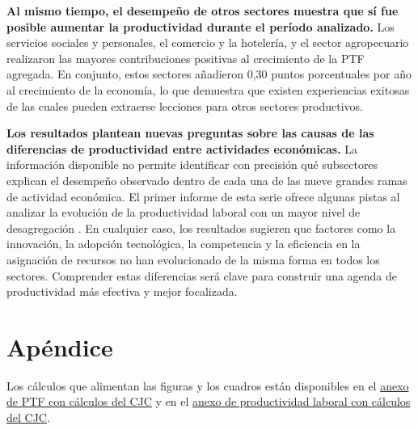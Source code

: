 \textbf{Al mismo tiempo, el desempeño de otros sectores muestra que sí fue posible aumentar la productividad durante el período analizado.} Los servicios sociales y personales, el comercio y la hotelería, y el sector agropecuario realizaron las mayores contribuciones positivas al crecimiento de la PTF agregada. En conjunto, estos sectores añadieron 0,30 puntos porcentuales por año al crecimiento de la economía, lo que demuestra que existen experiencias exitosas de las cuales pueden extraerse lecciones para otros sectores productivos.

\textbf{Los resultados plantean nuevas preguntas sobre las causas de las diferencias de productividad entre actividades económicas.} La información disponible no permite identificar con precisión qué subsectores explican el desempeño observado dentro de cada una de las nueve grandes ramas de actividad económica. El primer informe de esta serie ofrece algunas pistas al analizar la evolución de la productividad laboral con un mayor nivel de desagregación \citep{PardoOrozco2026ProductividadLaboral}. En cualquier caso, los resultados sugieren que factores como la innovación, la adopción tecnológica, la competencia y la eficiencia en la asignación de recursos no han evolucionado de la misma forma en todos los sectores. Comprender estas diferencias será clave para construir una agenda de productividad más efectiva y mejor focalizada.

{}

\small

\normalsize

\clearpage
\appendix
\renewcommand{\thetable}{A\arabic{table}}
\renewcommand{\thefigure}{A\arabic{figure}}
\renewcommand{\theHtable}{appendix.table.\arabic{table}}
\renewcommand{\theHfigure}{appendix.figure.\arabic{figure}}
\renewcommand{\theequation}{A\arabic{equation}}
\renewcommand{\theHequation}{appendix.equation.\arabic{equation}}
\setcounter{table}{0}
\setcounter{figure}{0}
\setcounter{equation}{0}

\section{Apéndice}
\thispagestyle{fancy}


Los cálculos que alimentan las figuras y los cuadros están disponibles en el \href{https://github.com/oliverpardo1979/informe_ptf/blob/main/outputs/ptf_pesos_vbp_20260727_financieras/anex-PTF-Productividad-2025_con_calculos_CJC.xlsx}{anexo de PTF con cálculos del CJC} y en el \href{https://github.com/oliverpardo1979/informe_ptf/blob/main/outputs/ptf_pesos_vbp_20260727_financieras/anex-PTF-ProductividadLaboral-2025_con_calculos_CJC.xlsx}{anexo de productividad laboral con cálculos del CJC}. %

